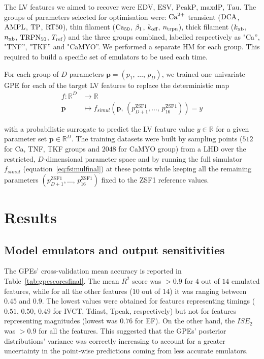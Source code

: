\vspace{0.2cm}
The LV features we aimed to recover were $\textrm{EDV}$, $\textrm{ESV}$, $\textrm{PeakP}$, $\textrm{maxdP}$, $\textrm{Tau}$. The groups of parameters selected for optimisation were: $\textrm{Ca}^{2+}$ transient ($\textrm{DCA}$, $\textrm{AMPL}$, $\textrm{TP}$, $\textrm{RT50}$), thin filament ($\textrm{Ca}_{50}$, $\beta_1$, $k_{\textrm{off}}$, $n_{\textrm{trpn}}$), thick filament ($k_{\textrm{xb}}$, $n_{\textrm{xb}}$, $\textrm{TRPN}_{50}$, $T_{\textrm{ref}}$) and the three groups combined, labelled respectively as "Ca'', "TNF'', "TKF'' and "CaMYO''. We performed a separate HM for each group. This required to build a specific set of emulators to be used each time.

\vspace{0.2cm}
For each group of $D$ parameters $\mathbf{p}=(p_1,\,\dots,\,p_D)$, we trained one univariate GPE for each of the target LV features to replace the deterministic map
%
\begin{align}
    f\colon\mathbb{R}^D &\to \mathbb{R} \\
    \mathbf{p} &\mapsto f_{simul}(\mathbf{p},\,(p_{D+1}^{\textrm{ZSF1}},\dots,\,p_{16}^{\textrm{ZSF1}}))=y
\end{align}

\vspace{0.2cm}\noindent
with a probabilistic surrogate to predict the LV feature value $y\in\mathbb{R}$ for a given parameter set $\mathbf{p}\in\mathbb{R}^D$. The training datasets were built by sampling points ($512$ for Ca, TNF, TKF groups and $2048$ for CaMYO group) from a LHD over the restricted, $D$-dimensional parameter space and by running the full simulator $f_{simul}$ (equation~\eqref{eq:fsimulfinal}) at these points while keeping all the remaining parameters $(p_{D+1}^{\textrm{ZSF1}},\dots,\,p_{16}^{\textrm{ZSF1}})$ fixed to the ZSF1 reference values. 


%
%
%
\section{Results}\label{sec:ch7results}


%
%
%
\subsection{Model emulators and output sensitivities}\label{sec:ch7model_emulators_and_output_sensitivities}
The GPEs' cross-validation mean accuracy is reported in Table~\ref{tab:gpescoresfinal}. The mean $R^2$ score was $>0.9$ for $4$ out of $14$ emulated features, while for all the other features ($10$ out of $14$) it was ranging between $0.45$ and $0.9$. The lowest values were obtained for features representing timings ($0.51$, $0.50$, $0.49$ for IVCT, Tdiast, Tpeak, respectively) but not for features representing magnitudes (lowest was $0.76$ for EF). On the other hand, the $ISE_{2}$ was $>0.9$ for all the features. This suggested that the GPEs' posterior distributions' variance was correctly increasing to account for a greater uncertainty in the point-wise predictions coming from less accurate emulators.

